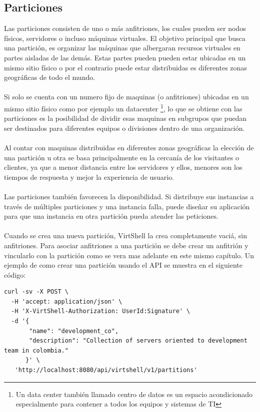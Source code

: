 \subsection{Particiones}
Las particiones consisten de uno o más anfitriones, los cuales pueden ser nodos físicos, servidores o incluso máquinas virtuales. El objetivo principal que busca una partición, es organizar las máquinas que albergaran recursos virtuales en partes aisladas de las demás. Estas partes pueden pueden estar ubicadas en un mismo sitio físico o por el contrario puede estar distribuidas es diferentes zonas geográficas de todo el mundo.\\
\\
Si solo se cuenta con un numero fijo de maquinas (o anfitriones) ubicadas en un mismo sitio físico como por ejemplo un datacenter \footnote{Un data center también llamado centro de datos es un espacio acondicionado especialmente para contener a todos los equipos y sistemas de TI}, lo que se obtiene con las particiones es la posibilidad de dividir esas maquinas en subgrupos que puedan ser destinados para diferentes equipos o divisiones dentro de una organización.\\ 
\\
Al contar con maquinas distribuidas en diferentes zonas geográficas la elección de una partición u otra se basa principalmente en la cercanía de los visitantes o clientes, ya que a menor distancia entre los servidores y ellos, menores son los tiempos de respuesta y mejor la experiencia de usuario.\\
\\
Las particiones también favorecen la disponibilidad. Si distribuye sus instancias a través de múltiples particiones y una instancia falla, puede diseñar su aplicación para que una instancia en otra partición pueda atender las peticiones.\\
\\
Cuando se crea una nueva partición, VirtShell la crea completamente vaciá, sin anfitriones. Para asociar anfitriones a una partición se debe crear un anfitrión y vincularlo con la partición como se vera mas adelante en este mismo capítulo. Un ejemplo de como crear una partición usando el API se muestra en el siguiente código:

\begin{lstlisting}[style=json, caption=Petición HTTP para crear una partición]
curl -sv -X POST \
  -H 'accept: application/json' \
  -H 'X-VirtShell-Authorization: UserId:Signature' \
  -d '{
  	   "name": "development_co",
       "description": "Collection of servers oriented to development team in colombia."
      }' \
   'http://localhost:8080/api/virtshell/v1/partitions'
\end{lstlisting}


